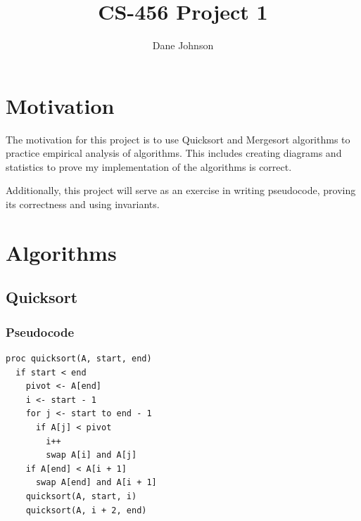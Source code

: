 \documentclass[a4paper,12pt]{article}
\begin{document}
\title{CS-456 Project 1}
\author{Dane Johnson}
\maketitle
\newpage
\section{Motivation}

The motivation for this project is to use Quicksort and Mergesort algorithms to practice empirical analysis of algorithms.
This includes creating diagrams and statistics to prove my implementation of the algorithms is correct.

Additionally, this project will serve as an exercise in writing pseudocode, proving its correctness and using invariants.
\section{Algorithms}
\subsection{Quicksort}
\subsubsection{Pseudocode}
\begin{verbatim}
proc quicksort(A, start, end)
  if start < end
    pivot <- A[end]
    i <- start - 1 
    for j <- start to end - 1
      if A[j] < pivot
        i++
        swap A[i] and A[j]
    if A[end] < A[i + 1]
      swap A[end] and A[i + 1]
    quicksort(A, start, i)
    quicksort(A, i + 2, end)
\end{verbatim}
\end{document}

